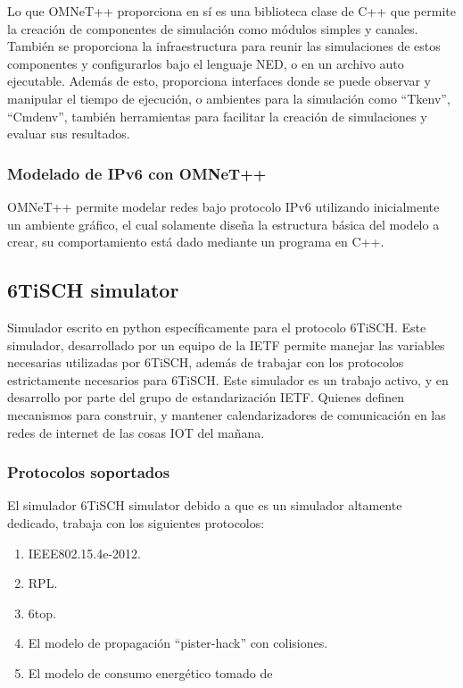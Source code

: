 Lo que OMNeT++ proporciona en sí es una biblioteca clase de C++ que permite la creación de componentes de simulación como módulos simples y canales. También se proporciona la infraestructura para reunir las simulaciones de estos componentes y configurarlos bajo el lenguaje NED, o en un archivo auto ejecutable. Además de esto, proporciona interfaces donde se puede observar y manipular el tiempo de ejecución, o ambientes para la simulación como ``Tkenv'', ``Cmdenv'', también herramientas para facilitar la creación de simulaciones y evaluar sus resultados.\cite{omnet}

\subsubsection{Modelado de IPv6 con OMNeT++}

OMNeT++ permite modelar redes bajo protocolo IPv6 utilizando inicialmente un ambiente gráfico, el cual solamente diseña la estructura básica del modelo a crear, su comportamiento está dado mediante un programa en C++.


\newpage

\subsection{6TiSCH simulator}
Simulador escrito en python específicamente para el protocolo 6TiSCH. Este simulador, desarrollado por un equipo de la IETF permite manejar las variables necesarias utilizadas por 6TiSCH, además de trabajar con los protocolos estrictamente necesarios para 6TiSCH.
Este simulador es un trabajo activo, y en desarrollo por parte del grupo de estandarización IETF. Quienes definen mecanismos para construir, y mantener calendarizadores de comunicación en las redes de internet de las cosas IOT del mañana.

\subsubsection{Protocolos soportados}

El simulador 6TiSCH simulator debido a que es un simulador altamente dedicado, trabaja con los siguientes protocolos:

\begin{enumerate}
    \item IEEE802.15.4e-2012.
    \item RPL.
    \item 6top.
    \item El modelo  de propagación ``pister-hack'' con colisiones.
    \item El modelo de consumo energético tomado de \cite{vilajosana2014realistic}
\end{enumerate}


